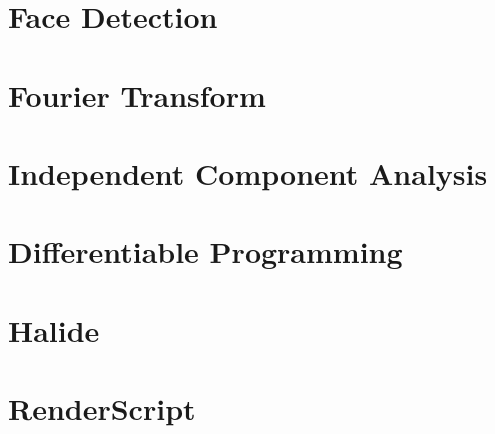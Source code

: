 \section{Face Detection}
\section{Fourier Transform}
\section{Independent Component Analysis}
\section{Differentiable Programming}
\section{Halide}
\section{RenderScript}